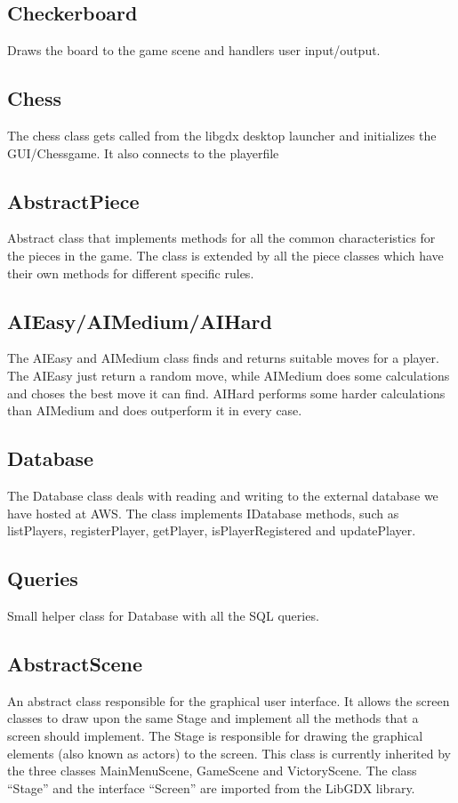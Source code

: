 \documentclass{article}
\begin{document}
\subsection {Checkerboard}
Draws the board to the game scene and handlers user input/output.

\subsection {Chess}
The chess class gets called from the libgdx desktop launcher and initializes the GUI/Chessgame. It also connects to the playerfile

\subsection {AbstractPiece}
Abstract class that implements methods for all the common characteristics for the pieces in the game. The class is extended by all the piece classes which have their own methods for different specific rules.

\subsection {AIEasy/AIMedium/AIHard}
The AIEasy and AIMedium class finds and returns suitable moves for a player. The AIEasy just return a random move, while AIMedium does some calculations and choses the best move it can find.
AIHard performs some harder calculations than AIMedium and does outperform it in every case.

\subsection {Database}
The Database class deals with reading and writing to the external database we have hosted at AWS. The class implements IDatabase methods, such as listPlayers, registerPlayer, getPlayer, isPlayerRegistered and updatePlayer.

\subsection {Queries}
Small helper class for Database with all the SQL queries.

\subsection {AbstractScene}
An abstract class responsible for the graphical user interface. It allows the screen classes to draw upon the same Stage and implement all the methods that a screen should implement. The Stage is responsible for drawing the graphical elements (also known as actors) to the screen. This class is currently inherited by the three classes MainMenuScene, GameScene and VictoryScene. The class “Stage”  and the interface “Screen” are imported from the LibGDX library.
\end{document}
